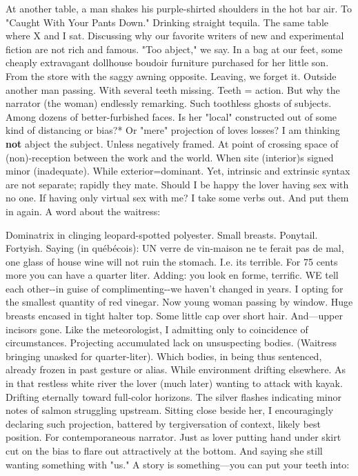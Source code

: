 At another table, a man shakes his purple-shirted shoulders in the hot
bar air. To "Caught With Your Pants Down." Drinking straight tequila.
The same table where X and I sat. Discussing why our favorite writers of
new and experimental fiction are not rich and famous. "Too abject," we
say. In a bag at our feet, some cheaply extravagant dollhouse boudoir
furniture purchased for her little son. From the store with the saggy
awning opposite. Leaving, we forget it. Outside another man passing.
With several teeth missing. Teeth = action. But why the narrator (the
woman) endlessly remarking. Such toothless ghosts of subjects. Among
dozens of better-furbished faces. Is her "local" constructed out of some
kind of distancing or bias?* Or "mere" projection of loves losses? I am
thinking \textbf{not} abject the subject. Unless negatively framed. At
point of crossing space of (non)-reception between the work and the
world. When site (interior)s signed minor (inadequate). While
exterior=dominant. Yet, intrinsic and extrinsic syntax are not separate;
rapidly they mate. Should I be happy the lover having sex with no one.
If having only virtual sex with me? I take some verbs out. And put them
in again. A word about the waitress:

Dominatrix in clinging leopard-spotted polyester. Small breasts.
Ponytail. Fortyish. Saying (in québécois): UN verre de vin-maison ne te
ferait pas de mal, one glass of house wine will not ruin the stomach.
I.e. its terrible. For 75 cents more you can have a quarter liter.
Adding: you look en forme, terrific. WE tell each other-\/-in guise of
complimenting-\/-we haven't changed in years. I opting for the smallest
quantity of red vinegar. Now young woman passing by window. Huge breasts
encased in tight halter top. Some little cap over short hair.
And---upper incisors gone. Like the meteorologist, I admitting only to
coincidence of circumstances. Projecting accumulated lack on
unsuspecting bodies. (Waitress bringing unasked for quarter-liter).
Which bodies, in being thus sentenced, already frozen in past gesture or
alias. While environment drifting elsewhere. As in that restless white
river the lover (much later) wanting to attack with kayak. Drifting
eternally toward full-color horizons. The silver flashes indicating
minor notes of salmon struggling upstream. Sitting close beside her, I
encouragingly declaring such projection, battered by tergiversation of
context, likely best position. For contemporaneous narrator. Just as
lover putting hand under skirt cut on the bias to flare out attractively
at the bottom. And saying she still wanting something with "us." A story
is something---you can put your teeth into:

